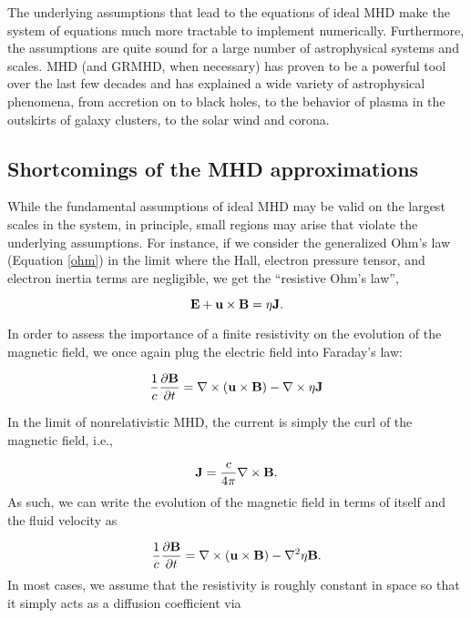 The underlying assumptions that lead to the equations of ideal MHD make the system of equations much more tractable to implement numerically.  Furthermore, the assumptions are quite sound for a large number of astrophysical systems and scales.  MHD (and GRMHD, when necessary) has proven to be a powerful tool over the last few decades and has explained a wide variety of astrophysical phenomena, from accretion on to black holes, to the behavior of plasma in the outskirts of galaxy clusters, to the solar wind and corona.

\subsection{Shortcomings of the MHD approximations}
While the fundamental assumptions of ideal MHD may be valid on the largest scales in the system, in principle, small regions may arise that violate the underlying assumptions.  For instance, if we consider the generalized Ohm's law (Equation \ref{ohm}) in the limit where the Hall, electron pressure tensor, and electron inertia terms are negligible, we get the ``resistive Ohm's law'',

\begin{equation}
\bold{E} + \bold{u} \times \bold{B} = \eta \bold{J}.
\end{equation}

In order to assess the importance of a finite resistivity on the evolution of the magnetic field, we once again plug the electric field into Faraday's law:


\begin{equation}
	\frac{1}{c}\frac{\partial \bold{B}}{\partial t} =\nabla \times (\bold{u}\times\bold{B}) -\nabla \times \eta \bold{J}
	\label{faraday_resistive}
\end{equation}
	
In the limit of nonrelativistic MHD, the current is simply the curl of the magnetic field, i.e.,

\begin{equation}
	\bold{J} = \frac{c}{4\pi}\nabla \times \bold{B}.
\end{equation}
As such, we can write the evolution of the magnetic field in terms of itself and the fluid velocity as 

\begin{equation}
	\frac{1}{c}\frac{\partial \bold{B}}{\partial t} =\nabla \times (\bold{u}\times\bold{B}) -\nabla^2 \eta \bold{B}.
\end{equation}
In most cases, we assume that the resistivity is roughly constant in space so that it simply acts as a diffusion coefficient via

